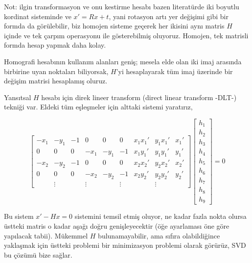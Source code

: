 \documentclass[12pt,fleqn]{article}\usepackage{../../common}
\begin{document}
Not: ilgin transformasyon ve onu kestirme hesabı bazen literatürde iki
boyutlu kordinat sisteminde ve $x' = R x + t$, yani rotasyon artı yer
değişimi gibi bir formda da görülebilir, biz homojen sisteme geçerek her
ikisini aynı matris $H$ içinde ve tek çarpım operasyonu ile gösterebilmiş
oluyoruz. Homojen, tek matrisli formda hesap yapmak daha kolay.

Homografi hesabının kullanım alanları geniş; mesela elde olan iki imaj
arasında birbirine uyan noktaları biliyorsak, $H$'yi hesaplayarak tüm imaj
üzerinde bir değişim matrisi hesaplamış oluruz. 

Yansıtsal $H$ hesabı için direk lineer transform (direct linear transform
-DLT-) tekniği var. Eldeki tüm eşleşmeler için alttaki sistemi yaratırız,

$$ 
\left[\begin{array}{rrrrrrrrr}
-x_1 & -y_1 & -1 & 0 & 0 & 0 & x_1x_1' & y_1x_1' & x_1' \\
0 & 0 & 0 & -x_1 & -y_1 & -1 & x_1y_1' & y_1y_1' & y_1' \\
-x_2 & -y_2 & -1 & 0 & 0 & 0 & x_2x_2' & y_2x_2' & x_2' \\
0 & 0 & 0 & -x_2 & -y_2 & -1 & x_2y_2' & y_2y_2' & y_2' \\
 &  \vdots &  &  \vdots &  & \vdots &  &  \vdots & 
\end{array}\right]
\left[\begin{array}{r}
h_1 \\ h_2 \\ h_3 \\ h_4 \\ h_5 \\ h_6 \\ h_7 \\ h_8 \\ h_9 
\end{array}\right] = 0
$$

Bu sistem $x' - Hx = 0$ sistemini temsil etmiş oluyor, ne kadar fazla nokta
olursa üstteki matris o kadar aşağı doğru genişleyecektir (öğe ayarlaması
öne göre yapılacak tabii). Mükemmel $H$ bulunamayabilir, ama sıfıra
olabildiğince yaklaşmak için üstteki problemi bir minimizasyon problemi
olarak görürüz, SVD bu çözümü bize sağlar. 
\end{document}

